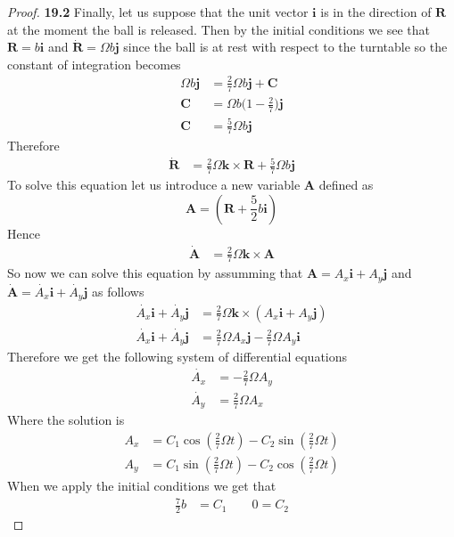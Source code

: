 \documentclass[11pt]{article}
\newcommand{\uvi}{\bm{i}}
\newcommand{\uvj}{\bm{j}}
\newcommand{\uvk}{\bm{k}}
\theoremstyle{definition}
\begin{document}
\begin{proof}{\textbf{19.2}}
    Finally, let us suppose that the unit vector $\uvi$ is in the direction of
    $\bm{R}$ at the moment the ball is released. Then by the initial conditions
    we see that $\bm{R} = b\uvi$ and $\bm{\dot{R}} = \Omega b\uvj$ since the
    ball is at rest with respect to the turntable so the constant of
    integration becomes
    \begin{align*}
        \Omega b\uvj &= \frac{2}{7}\Omega b\uvj + \bm{C}\\
        \bm{C} &= \Omega b\bigg(1 -\frac{2}{7}\bigg)\uvj\\
        \bm{C} &= \frac{5}{7}\Omega b\uvj
    \end{align*}
    Therefore
    \begin{align*}
        \bm{\dot R} &= \frac{2}{7}\Omega \uvk \times \bm{R}
        + \frac{5}{7}\Omega b\uvj
    \end{align*}
    To solve this equation let us introduce a new variable $\bm{A}$ defined as
    $$\bm{A} = (\bm{R} + \frac{5}{2} b\uvi)$$
    Hence
    \begin{align*}
        \bm{\dot{A}} &= \frac{2}{7}\Omega \uvk \times \bm{A}
    \end{align*}
    So now we can solve this equation by assumming that 
    $\bm{A} = A_x\uvi + A_y\uvj$ and 
    $\bm{\dot{A}} = \dot{A_x}\uvi + \dot{A_y}\uvj$ as follows
    \begin{align*}
        \dot{A_x}\uvi + \dot{A_y}\uvj
        &= \frac{2}{7}\Omega \uvk \times (A_x\uvi + A_y\uvj)\\
        \dot{A_x}\uvi + \dot{A_y}\uvj
        &= \frac{2}{7}\Omega A_x \uvj - \frac{2}{7}\Omega A_y\uvi
    \end{align*}
    Therefore we get the following system of differential equations
    \begin{align*}
        \dot{A_x} &= -\frac{2}{7}\Omega A_y\\
        \dot{A_y} &= \frac{2}{7}\Omega A_x
    \end{align*}
    Where the solution is 
    \begin{align*}
        A_x &= C_1\cos(\frac{2}{7}\Omega t) - C_2\sin(\frac{2}{7}\Omega t)\\
        A_y &= C_1\sin(\frac{2}{7}\Omega t) - C_2\cos(\frac{2}{7}\Omega t)
    \end{align*}
    When we apply the initial conditions we get that 
    \begin{align*}
        \frac{7}{2}b &= C_1 \qquad 0 = C_2
    \end{align*}

\end{proof}
\end{document}
